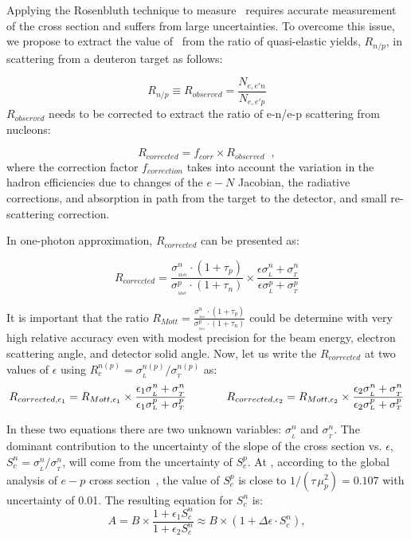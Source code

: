 Applying the Rosenbluth technique to measure \gen~requires accurate measurement of the cross section  and suffers from large uncertainties. 
To overcome this issue, we propose to extract the value of \gen~from the ratio of quasi-elastic yields, $R_{n/p}$, in scattering from a deuteron target as follows: 

\begin{equation}
R_{n/p} \equiv R_{observed} = \frac{N_{e,e'n}}{N_{e,e'p}}
\label{eq:1}
\end{equation}
$R_{observed}$ needs to be corrected to extract the ratio of e-n/e-p scattering from nucleons:

\begin{equation}
R_{corrected} = f_{corr} \times R_{observed} \;\; ,
\label{eq:2}
\end{equation}
where the correction factor $f_{correction}$ takes into account the variation in the hadron efficiencies due to changes of the $e-N$ Jacobian, the radiative corrections, and absorption in path
from the target to the detector, and small re-scattering correction.

In one-photon approximation, $R_{corrected}$ can be presented as: 

\begin{equation}
R_{corrected} = \frac {\sigma_{_{_{Mott}}}^n \cdot (1+\tau_p)}{\sigma_{_{_{Mott}}}^p \cdot (1+\tau_n)} \times \frac{\epsilon \sigma_{_L}^n + \sigma_{_T}^n}{\epsilon \sigma_{_L}^p + \sigma_{_T}^p}
\end{equation}

It is important that the ratio $R_{Mott} = \frac {\sigma_{_{_{Mott}}}^n \cdot (1+\tau_p)}{\sigma_{_{_{Mott}}}^p \cdot (1+\tau_n)}$ could be determine with very high relative accuracy even with modest precision for the beam energy, electron scattering angle, and detector solid angle. 
Now, let us write the $R_{corrected}$ at two values of $\epsilon$ using $R_c^{n(p)} = \sigma_{_L}^{n(p)}/ \sigma_{_T}^{n(p)}$ as:
\begin{equation*}
R_{{corrected},\epsilon_1} = R_{Mott,\epsilon_1} \times \frac{\epsilon_1 \sigma_{_L}^n + \sigma_{_T}^n}{\epsilon_1 \sigma_{_L}^p + \sigma_{_T}^p}
\hskip .5 in
R_{{corrected},\epsilon_2} = R_{Mott,\epsilon_2} \times \frac{\epsilon_2 \sigma_{_L}^n + \sigma_{_T}^n}{\epsilon_2 \sigma_{_L}^p + \sigma_{_T}^p}
\end{equation*}

In these two equations there are two unknown variables: $\sigma_{_L}^n$ and $\sigma_{_T}^n$.
The dominant contribution to the uncertainty of the slope of the cross section vs. $\epsilon$,  
$S_c^n = \sigma_{_L}^n/ \sigma_{_T}^n$, will come from the uncertainty of $S_c^p$.
At  \gevcsq, according to the global analysis of $e-p$ cross section~\cite{Christy2020ab}, the value of $S_c^p$ is close to $1/(\tau \, \mu_p^2) = 0.107$ with uncertainty of 0.01.
The resulting equation for $S_c^n$ is:
\begin{equation*}
A = B \times \frac{1 + \epsilon_1 S_c^n}{1 + \epsilon_2 S_c^n} \approx B \times (1 +  \Delta \epsilon \cdot S_c^n),
\end{equation*}

